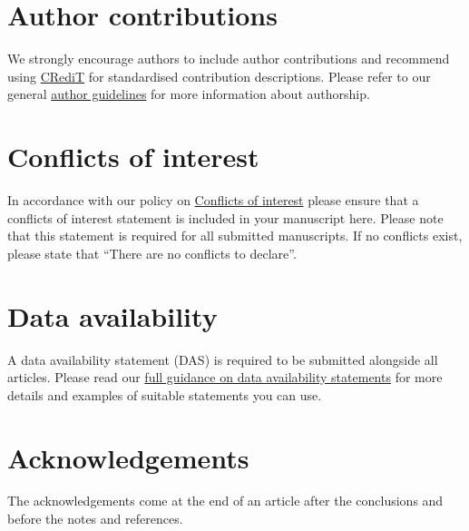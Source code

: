 \documentclass[twoside,twocolumn,9pt]{article}
\renewcommand{\refname}{Notes and references}
\begin{document}
\section*{Author contributions}
We strongly encourage authors to include author contributions and recommend using \href{https://casrai.org/credit/}{CRediT} for standardised contribution descriptions. Please refer to our general \href{https://www.rsc.org/journals-books-databases/journal-authors-reviewers/author-responsibilities/}{author guidelines} for more information about authorship.

\section*{Conflicts of interest}
In accordance with our policy on \href{https://www.rsc.org/journals-books-databases/journal-authors-reviewers/author-responsibilities/#code-of-conduct}{Conflicts of interest} please ensure that a conflicts of interest statement is included in your manuscript here.  Please note that this statement is required for all submitted manuscripts.  If no conflicts exist, please state that ``There are no conflicts to declare''.

\section*{Data availability}


A data availability statement (DAS) is required to be submitted alongside all articles. Please read our \href{https://www.rsc.org/journals-books-databases/author-and-reviewer-hub/authors-information/prepare-and-format/data-sharing/#dataavailabilitystatements}{full guidance on data availability statements} for more details and examples of suitable statements you can use.

\section*{Acknowledgements}

The acknowledgements come at the end of an article after the conclusions and before the notes and references. 



\balance


\end{document}
